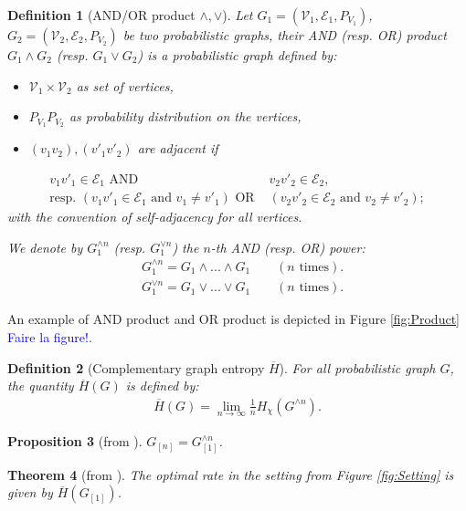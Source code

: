 \documentclass[conference,a4paper]{IEEEtran}
\newtheorem{theorem}{Theorem}[section]
\newtheorem{definition}[theorem]{Definition}
\newtheorem{proposition}[theorem]{Proposition}
\begin{document}
\begin{definition}[AND/OR product $\wedge, \vee$]
Let $G_1 = (\mathcal{V}_1, \mathcal{E}_1, P_{V_1})$, $G_2 = (\mathcal{V}_2, \mathcal{E}_2, P_{V_2})$ be two probabilistic graphs, their AND (resp. OR) product $G_1 \wedge G_2$ (resp. $G_1 \vee G_2$) is a probabilistic graph defined by: 
\begin{itemize}[label = -]
    \item $\mathcal{V}_1 \times \mathcal{V}_2$ as set of vertices,
    \item $P_{V_1}P_{V_2}$ as probability distribution on the vertices,
    \item $(v_1 v_2),(v'_1 v'_2)$ are adjacent if 
\end{itemize}
    \begin{align}
     v_1v'_1 \in \mathcal{E}_1 \text{ AND }& v_2v'_2 \in \mathcal{E}_2, \\
    \text{resp. }  (v_1v'_1 \in \mathcal{E}_1 \text{ and } v_1 \neq v'_1) \text{ OR }& (v_2v'_2 \in \mathcal{E}_2 \text{ and } v_2 \neq v'_2);\nonumber
\end{align}
    with the convention of self-adjacency for all vertices.
    
We denote by $G_1^{\wedge n}$ (resp. $G_1^{\vee n}$) the $n$-th AND (resp. OR) power:
\begin{align}
    & G_1^{\wedge n} = G_1 \wedge ... \wedge G_1 \qquad (n \text{ times}). \\
    & G_1^{\vee n} = G_1 \vee ... \vee G_1 \qquad (n \text{ times}).
\end{align}
\end{definition}

An example of AND product and OR product is depicted in Figure \ref{fig:Product} \textcolor{blue}{Faire la figure!}.
 
\begin{definition}[Complementary graph entropy $\overline{H}$]
    For all probabilistic graph $G$, the quantity $\overline{H}(G)$ is defined by:
    \begin{align}
        \overline{H}(G) = \lim_{n \rightarrow \infty} \frac{1}{n} H_{\chi}(G^{\wedge n}).
    \end{align}
\end{definition}

\begin{proposition}[from \cite{alon1996source}]
    $G_{[n]} = G_{[1]}^{\wedge n}$.
\end{proposition}

\begin{theorem}[from \cite{alon1996source}]
    The optimal rate in the setting from Figure \ref{fig:Setting} is given by $\overline{H}(G_{[1]})$.
\end{theorem}
\end{document}
